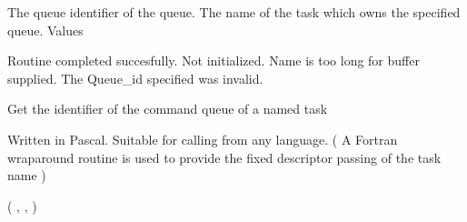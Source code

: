 \begin{appendix}
\begin{manroutinedescription}
\begin{manparametertable}
                          The queue identifier of the queue.
                          The name of the task which owns the
                          specified queue.
      {} Values
\end{manparametertable}
\begin{mantwocolumntable}
  Routine completed succesfully.
  {} Not initialized.
 Name is too long for buffer %
supplied.
  The Queue\_id specified was %
invalid.
\end{mantwocolumntable}
\end{manroutinedescription}
\begin{manroutinedescription}
      Get the identifier of the command queue of a named task

      Written in Pascal. Suitable for calling from any language.
      ( A Fortran wraparound routine is used to provide the fixed
      descriptor passing of the task name )

      {} {\mantt{=}} {} ( {}, {}, {} )


\end{manroutinedescription}
\end{appendix}

